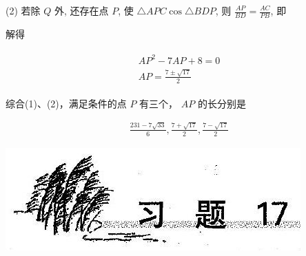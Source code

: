 \documentclass[10pt]{article}
\begin{document}
(2) 若除 $Q$ 外, 还存在点 $P$, 使 $\triangle A P C \cos \triangle B D P$, 则 $\frac{A P}{B D}=\frac{A C}{P B}$, 即

解得

\begin{align*}
\begin{gathered}
A P^{2}-7 A P+8=0 \\
A P=\frac{7 \pm \sqrt{17}}{2}
\end{gathered}
\end{align*}

综合(1)、(2)，满足条件的点 $P$ 有三个， $A P$ 的长分别是

\begin{align*}
\frac{231-7 \sqrt{33}}{6}, \frac{7+\sqrt{17}}{2}, \frac{7-\sqrt{17}}{2}
\end{align*}

\begin{center}
\includegraphics[max width=\textwidth]{2024_10_30_26b590fd1106d28139f0g-120}
\end{center}
\end{document}
